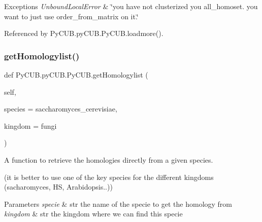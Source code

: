 \begin{DoxyExceptions}{Exceptions}
{\em Unbound\+Local\+Error} & \char`\"{}you have not clusterized you \textquotesingle{}all\+\_\+homoset\textquotesingle{}. you want to just use \textquotesingle{}order\+\_\+from\+\_\+matrix\textquotesingle{} on it.\char`\"{} \\
\hline
\end{DoxyExceptions}


Referenced by Py\+C\+U\+B.\+py\+C\+U\+B.\+Py\+C\+U\+B.\+loadmore().

\mbox{\label{class_py_c_u_b_1_1py_c_u_b_1_1_py_c_u_b_ae06a2843c0718f86396ee255dfc6ae6f}} 
\subsubsection{\texorpdfstring{get\+Homologylist()}{getHomologylist()}}
{\footnotesize\ttfamily def Py\+C\+U\+B.\+py\+C\+U\+B.\+Py\+C\+U\+B.\+get\+Homologylist (\begin{DoxyParamCaption}\item[{}]{self,  }\item[{}]{species = {\ttfamily \textquotesingle{}saccharomyces\+\_\+cerevisiae\textquotesingle{}},  }\item[{}]{kingdom = {\ttfamily \textquotesingle{}fungi\textquotesingle{}} }\end{DoxyParamCaption})}



A function to retrieve the homologies directly from a given species. 

(it is better to use one of the key species for the different kingdoms (sacharomyces, HS, Arabidopsis..))


\begin{DoxyParams}{Parameters}
{\em specie} & str the name of the specie to get the homology from \\
\hline
{\em kingdom} & str the kingdom where we can find this specie \\
\hline
\end{DoxyParams}
\mbox{\label{class_py_c_u_b_1_1py_c_u_b_1_1_py_c_u_b_a2745e82c660b71220578130e74e32add}} 
